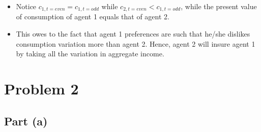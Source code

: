 \documentclass{scrartcl}
\newcommand{\bit}{\begin{itemize}}
\newcommand{\eit}{\end{itemize}}
\begin{document}
\bit

\item Notice $c_{1,t=even}=c_{1,t=odd}$ while $c_{2,t=even}<c_{1,t=odd}$, while the present value of consumption of agent 1 equals that of agent 2. 

\item This owes to the fact that agent 1 preferences are such that he/she dislikes consumption variation more than agent 2. Hence, agent 2 will insure agent 1 by taking all the variation in aggregate income.

\eit

\section*{Problem 2}

\subsection*{Part (a)}
\end{document}
